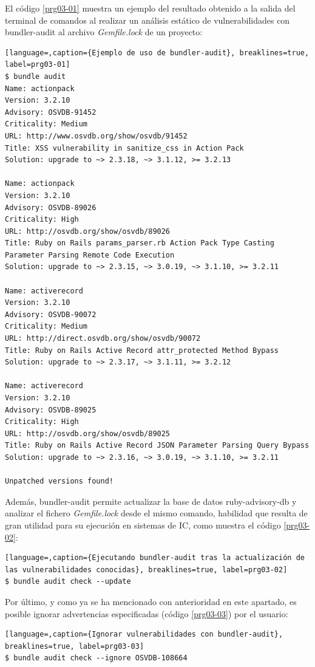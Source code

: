 El código \ref{prg03-01} muestra un ejemplo del resultado obtenido a la salida del terminal de comandos al realizar un análisis estático de vulnerabilidades con bundler-audit al archivo \textit{Gemfile.lock} de un proyecto:

\begin{lstlisting}[language=,caption={Ejemplo de uso de bundler-audit}, breaklines=true, label=prg03-01]
$ bundle audit
Name: actionpack
Version: 3.2.10
Advisory: OSVDB-91452
Criticality: Medium
URL: http://www.osvdb.org/show/osvdb/91452
Title: XSS vulnerability in sanitize_css in Action Pack
Solution: upgrade to ~> 2.3.18, ~> 3.1.12, >= 3.2.13

Name: actionpack
Version: 3.2.10
Advisory: OSVDB-89026
Criticality: High
URL: http://osvdb.org/show/osvdb/89026
Title: Ruby on Rails params_parser.rb Action Pack Type Casting Parameter Parsing Remote Code Execution
Solution: upgrade to ~> 2.3.15, ~> 3.0.19, ~> 3.1.10, >= 3.2.11

Name: activerecord
Version: 3.2.10
Advisory: OSVDB-90072
Criticality: Medium
URL: http://direct.osvdb.org/show/osvdb/90072
Title: Ruby on Rails Active Record attr_protected Method Bypass
Solution: upgrade to ~> 2.3.17, ~> 3.1.11, >= 3.2.12

Name: activerecord
Version: 3.2.10
Advisory: OSVDB-89025
Criticality: High
URL: http://osvdb.org/show/osvdb/89025
Title: Ruby on Rails Active Record JSON Parameter Parsing Query Bypass
Solution: upgrade to ~> 2.3.16, ~> 3.0.19, ~> 3.1.10, >= 3.2.11

Unpatched versions found!
\end{lstlisting}

Además, bundler-audit permite actualizar la base de datos ruby-advisory-db y analizar el fichero \textit{Gemfile.lock} desde el mismo comando, habilidad que resulta de gran utilidad para su ejecución en sistemas de \gls{IC}, como muestra el código \ref{prg03-02}:

\begin{lstlisting}[language=,caption={Ejecutando bundler-audit tras la actualización de las vulnerabilidades conocidas}, breaklines=true, label=prg03-02]
$ bundle audit check --update
\end{lstlisting}

Por último, y como ya se ha mencionado con anterioridad en este apartado, es posible ignorar advertencias especificadas (código \ref{prg03-03}) por el usuario:

\begin{lstlisting}[language=,caption={Ignorar vulnerabilidades con bundler-audit}, breaklines=true, label=prg03-03]
$ bundle audit check --ignore OSVDB-108664
\end{lstlisting}


